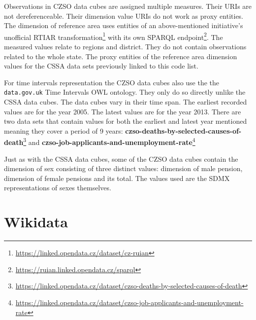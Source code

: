 Observations in CZSO data cubes are assigned multiple measures. Their URIs are not dereferenceable. Their dimension value URIs do not work as proxy entities. The dimension of reference area uses entities of an above-mentioned initiative's unofficial RTIAR transformation\footnote{\href{https://linked.opendata.cz/dataset/cz-ruian}{https://linked.opendata.cz/dataset/cz-ruian}} with its own SPARQL endpoint\footnote{\href{https://ruian.linked.opendata.cz/sparql}{https://ruian.linked.opendata.cz/sparql}}. The measured values relate to regions and district. They do not contain observations related to the whole state. The proxy entities of the reference area dimension values for the CSSA data sets previously linked to this code list. 

For time intervals representation the CZSO data cubes also use the the \verb|data.gov.uk| Time Intervals OWL ontology. They only do so directly unlike the CSSA data cubes. The data cubes vary in their time span. The earliest recorded values are for the year 2005. The latest values are for the year 2013. There are two data sets that contain values for both the earliest and latest year mentioned meaning they cover a period of 9 years: \textbf{czso-deaths-by-selected-causes-of-death}\footnote{\href{https://linked.opendata.cz/dataset/czso-deaths-by-selected-causes-of-death}{https://linked.opendata.cz/dataset/czso-deaths-by-selected-causes-of-death}} and \textbf{czso-job-applicants-and-unemployment-rate}\footnote{\href{https://linked.opendata.cz/dataset/czso-job-applicants-and-unemployment-rate}{https://linked.opendata.cz/dataset/czso-job-applicants-and-unemployment-rate}}

Just as with the CSSA data cubes, some of the CZSO data cubes contain the dimension of sex consisting of three distinct values: dimension of male pension, dimension of female pensions and its total. The values used are the SDMX representations of sexes themselves.

\section{Wikidata}


